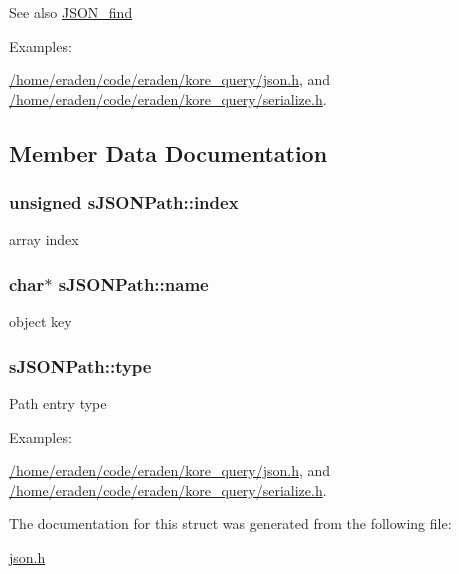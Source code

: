 \begin{DoxySeeAlso}{See also}
\hyperlink{json_8h_a6ea42f7260d5909a1287aca8676a7f3c}{J\+S\+O\+N\+\_\+find} 
\end{DoxySeeAlso}
\begin{Desc}
\item[Examples\+: ]\par
\hyperlink{_2home_2eraden_2code_2eraden_2kore_query_2json_8h-example}{/home/eraden/code/eraden/kore\+\_\+query/json.\+h}, and \hyperlink{_2home_2eraden_2code_2eraden_2kore_query_2serialize_8h-example}{/home/eraden/code/eraden/kore\+\_\+query/serialize.\+h}.\end{Desc}


\subsection{Member Data Documentation}
\subsubsection[{\texorpdfstring{index}{index}}]{\setlength{\rightskip}{0pt plus 5cm}unsigned s\+J\+S\+O\+N\+Path\+::index}\hypertarget{structsJSONPath_a0828364e7d45bd1bcca8f21b659596aa}{}\label{structsJSONPath_a0828364e7d45bd1bcca8f21b659596aa}
array index 
\subsubsection[{\texorpdfstring{name}{name}}]{\setlength{\rightskip}{0pt plus 5cm}char$\ast$ s\+J\+S\+O\+N\+Path\+::name}\hypertarget{structsJSONPath_a7fa6192b5aea8f8f69c3a3f668129f63}{}\label{structsJSONPath_a7fa6192b5aea8f8f69c3a3f668129f63}
object key 
\subsubsection[{\texorpdfstring{type}{type}}]{ s\+J\+S\+O\+N\+Path\+::type}\hypertarget{structsJSONPath_a6c4879fb81a51a713dc7867761e3b295}{}\label{structsJSONPath_a6c4879fb81a51a713dc7867761e3b295}
Path entry type \begin{Desc}
\item[Examples\+: ]\par
\hyperlink{_2home_2eraden_2code_2eraden_2kore_query_2json_8h-example}{/home/eraden/code/eraden/kore\+\_\+query/json.\+h}, and \hyperlink{_2home_2eraden_2code_2eraden_2kore_query_2serialize_8h-example}{/home/eraden/code/eraden/kore\+\_\+query/serialize.\+h}.\end{Desc}


The documentation for this struct was generated from the following file\+:\begin{DoxyCompactItemize}
\item 
\hyperlink{json_8h}{json.\+h}\end{DoxyCompactItemize}
